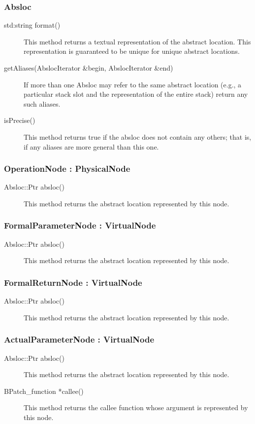\documentclass[12pt]{article}
\begin{document}
\subsubsection{Absloc}
\begin{description}
\item[std:string format()]
This method returns a textual representation of the abstract location. This representation is guaranteed to be unique for unique abstract locations.
\item[getAliases(AbslocIterator \&begin, AbslocIterator \&end)]
If more than one Absloc may refer to the same abstract location (e.g., a particular stack slot and the representation of the entire stack) return any such aliases.
\item[isPrecise()]
This method returns true if the absloc does not contain any others; that is, if any aliases are more general than this one.
\end{description}

\subsubsection{OperationNode : PhysicalNode}
\begin{description}
\item[Absloc::Ptr absloc()]
This method returns the abstract location represented by this node.
\end{description}

\subsubsection{FormalParameterNode : VirtualNode}
\begin{description}
\item[Absloc::Ptr absloc()]
This method returns the abstract location represented by this node. 
\end{description}

\subsubsection{FormalReturnNode : VirtualNode}
\begin{description}
\item[Absloc::Ptr absloc()]
This method returns the abstract location represented by this node.
\end{description}

\subsubsection{ActualParameterNode : VirtualNode}
\begin{description}
\item[Absloc::Ptr absloc()]
This method returns the abstract location represented by this node.
\item[BPatch\_function *callee() ]
This method returns the callee function whose argument is represented by this node.
\end{description}
\end{document}

